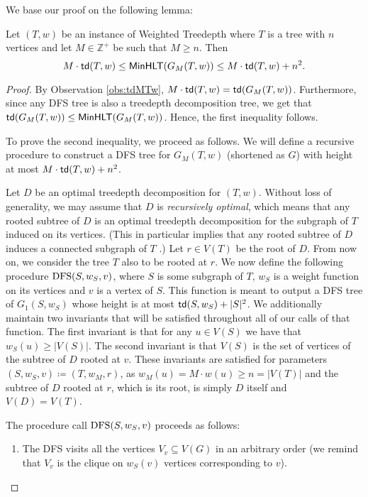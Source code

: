 \documentclass[a4paper,11pt]{article}
\begin{document}
We base our proof on the following lemma:
%
\begin{lemma}\label{lem:sandwich}
    Let $(T,w)$ be an instance of {\sc Weighted Treedepth} where $T$ is a tree with $n$ vertices and let $M\in \mathbb{Z}^+$ be such that $M\geq n$. Then 
    $$M\cdot\mathsf{td}(T,w)\leq \mathsf{MinHLT}(G_M(T,w)) \leq M\cdot \mathsf{td}(T,w) + n^2.$$
\end{lemma}
\begin{proof}
By Observation \ref{obs:tdMTw}, 
$M\cdot\mathsf{td}(T,w)= \mathsf{td}(G_M(T,w))$. Furthermore, since any DFS tree is also a treedepth decomposition tree, we get that $\mathsf{td}(G_M(T,w))\leq \mathsf{MinHLT}(G_M(T,w))$. Hence, the first inequality follows.

To prove the second inequality, we proceed as follows. We will define a recursive procedure to construct a DFS tree for $G_M(T,w)$ (shortened as $G$) with height at most $M\cdot \mathsf{td}(T,w) + n^2$. 

Let $D$ be an optimal treedepth decomposition for $(T,w)$. Without loss of generality, we may assume that $D$ is \emph{recursively optimal}, which means that any rooted subtree of $D$ is an optimal treedepth decomposition for the subgraph of $T$ induced on its vertices. 
(This in particular implies that any rooted subtree of $D$ induces a connected subgraph of $T$ \cite{DynamicTreedepth}.) 
Let $r\in V(T)$ be the root of $D$. From now on, we consider the tree $T$ also to be rooted at $r$. We now define the following procedure $\mathrm{DFS}(S,w_S,v)$, where $S$ is some subgraph of $T$, $w_S$ is a weight function on its vertices and $v$ is a vertex of $S$. This function is meant to output a DFS tree of $G_1(S, w_S)$ whose height is at most $\mathsf{td}(S, w_S) + |S|^2$.
We additionally maintain two invariants that will be satisfied throughout all of our calls of that function. The first invariant is that for any $u \in V(S)$ we have that $w_S(u) \ge |V(S)|$. The second invariant is that $V(S)$
is the set of vertices of the subtree of $D$ rooted at $v$. These invariants are satisfied for parameters $(S, w_S, v) \coloneqq (T, w_M, r)$, as $w_M(u) = M \cdot w(u) \ge n=|V(T)|$ and the subtree of $D$ rooted at $r$, which is its root, is simply $D$ itself and $V(D) = V(T)$.

The procedure call $\mathrm{DFS}(S, w_S, v)$ proceeds as follows:
\begin{enumerate}
	\item The DFS visits all the vertices $V_v\subseteq V(G)$ in an arbitrary order (we remind that $V_v$ is the clique on $w_S(v)$ vertices corresponding to $v$).


\end{enumerate}
\end{proof}
\end{document}
